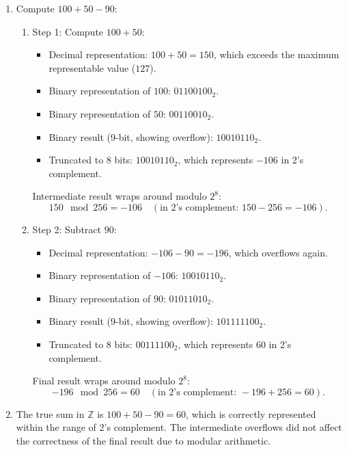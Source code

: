 \begin{enumerate}
    \item Compute \( 100 + 50 - 90 \):
    \begin{enumerate}
        \item Step 1: Compute \( 100 + 50 \):
        \begin{itemize}
            \item Decimal representation: \( 100 + 50 = 150 \), which exceeds the maximum representable value (\( 127 \)).
            \item Binary representation of \( 100 \): \( 01100100_2 \).
            \item Binary representation of \( 50 \): \( 00110010_2 \).
            \item Binary result (9-bit, showing overflow): \( 10010110_2 \).
            \item Truncated to 8 bits: \( 10010110_2 \), which represents \( -106 \) in 2's complement.
        \end{itemize}
        Intermediate result wraps around modulo \( 2^8 \):
        \[
        150 \mod 256 = -106 \quad (\text{in 2's complement: } 150 - 256 = -106).
        \]

        \item Step 2: Subtract \( 90 \):
        \begin{itemize}
            \item Decimal representation: \( -106 - 90 = -196 \), which overflows again.
            \item Binary representation of \( -106 \): \( 10010110_2 \).
            \item Binary representation of \( 90 \): \( 01011010_2 \).
            \item Binary result (9-bit, showing overflow): \( 101111100_2 \).
            \item Truncated to 8 bits: \( 00111100_2 \), which represents \( 60 \) in 2's complement.
        \end{itemize}
        Final result wraps around modulo \( 2^8 \):
        \[
        -196 \mod 256 = 60 \quad (\text{in 2's complement: } -196 + 256 = 60).
        \]
    \end{enumerate}
        \item     The true sum in \( \mathbb{Z} \) is \( 100 + 50 - 90 = 60 \), which is correctly represented within the range of 2's complement. The intermediate overflows did not affect the correctness of the final result due to modular arithmetic.
\end{enumerate}

